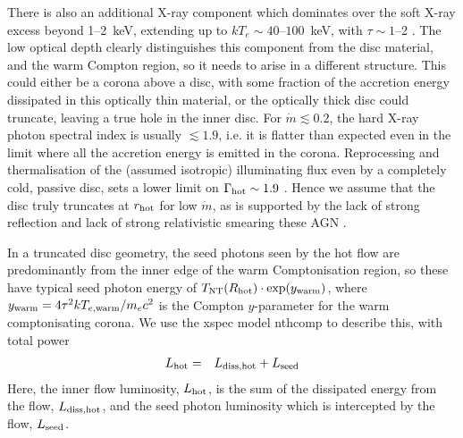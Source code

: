 \documentclass[a4paper,fleqn,usenatbib]{mnras}
\begin{document}
There is also an additional X-ray component which dominates over the
soft X-ray excess beyond 1--2~keV, extending up to
$kT_e\sim40$--$100$~keV, with $\tau\sim 1$--2
\citep{fabian2015,lubinski2016,petrucci2017}.  The low optical depth
clearly distinguishes this component from the disc material, and the
warm Compton region, so it needs to arise in a different
structure. This could either be a corona above a disc, with some
fraction of the accretion energy dissipated in this optically thin
material, or the optically thick disc could truncate, leaving a true
hole in the inner disc. For $\dot{m}\lesssim 0.2$, the hard X-ray
photon spectral index is usually $\lesssim 1.9$, i.e. it is flatter
than expected even in the limit where all the accretion energy is
emitted in the corona. Reprocessing and thermalisation of the (assumed
isotropic) illuminating flux even by a completely cold, passive disc,
sets a lower limit on $\Gamma_{\rm hot}\sim 1.9$
\citep{haardt1991,stern1995,malzac2005}.  Hence we assume that the
disc truly truncates at $r_{\rm hot}$ for low $\dot{m}$, as is
supported by the lack of strong reflection and lack of strong
relativistic smearing these AGN 
\citep{matt2014,yaqoob2016,porquet2018}.

In a truncated disc geometry, the seed photons seen by the hot flow
are predominantly from the inner edge of the warm Comptonisation
region, so these have typical seed photon energy of
$T_{\rm NT}(R_{\rm hot})\cdot \exp(y_{\rm warm})$, where 
$y_{\rm warm}=4\tau^2 kT_{e,\rm warm}/m_ec^2$ is the Compton 
$y$-parameter for the warm comptonisating corona.
 We use the {\sc xspec} model {\sc nthcomp} to
describe this, with total power
\begin{eqnarray}
\label{eq:Lhot}
L_{\rm hot}&=&L_{\rm diss,hot}+L_{\rm seed}
\end{eqnarray}
Here, the inner flow luminosity, $L_{\rm hot}$, is the sum of the
dissipated energy from the flow, $L_{\rm diss,hot}$, and the seed
photon luminosity which is intercepted by the flow, $L_{\rm seed}$.
\end{document}
